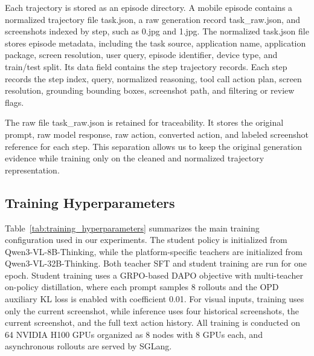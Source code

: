 Each trajectory is stored as an episode directory. A mobile episode
contains a normalized trajectory file task.json, a raw generation
record task\_raw.json, and screenshots indexed by step, such as
0.jpg and 1.jpg. The normalized
task.json file stores episode metadata, including the task
source, application name, application package, screen resolution, user query,
episode identifier, device type, and train/test split. Its data
field contains the step trajectory records. Each step records the step
index, query, normalized reasoning, tool call action plan, screen resolution,
grounding bounding boxes, screenshot path, and filtering or
review flags.

The raw file task\_raw.json is retained for traceability. It stores
the original prompt, raw model response, raw action, converted action, and
labeled screenshot reference for each step. This separation allows us to keep
the original generation evidence while training only on the cleaned and
normalized trajectory representation.


\subsection{Training Hyperparameters}

Table~\ref{tab:training_hyperparameters} summarizes the main training
configuration used in our experiments. The student policy is initialized from
Qwen3-VL-8B-Thinking, while the platform-specific teachers are
initialized from Qwen3-VL-32B-Thinking. Both teacher SFT and student
training are run for one epoch. Student training uses a GRPO-based DAPO
objective with multi-teacher on-policy distillation, where each prompt samples
8 rollouts and the OPD auxiliary KL loss is enabled with coefficient 0.01.
For visual inputs, training uses only the current screenshot, while inference
uses four historical screenshots, the current screenshot, and the full text
action history.
All training is conducted on 64 NVIDIA H100 GPUs organized as 8 nodes with
8 GPUs each, and asynchronous rollouts are served by SGLang.

